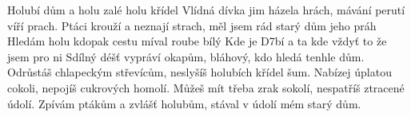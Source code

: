 \begin{TEXT}{Holubí dům}
\SLOKA {}  a  holu\NL
{}   \NL
{}  zalé\NL
{}   holu křídel 
\SLOKA Vlídná dívka jim házela hrách,\NL
   mávání perutí víří prach.\NL
   Ptáci krouží a neznají strach,\NL
   měl jsem rád starý dům jeho práh
\REFREN Hledám  holu kdopak  cestu  \NL
míval  roube bílý \NL
Kde je \Ch{}D7{bí} a ta  kde \NL
vždyť to  že jsem  pro ni 
\SLOKA Sdílný déšť vypráví okapům,\NL
   bláhový, kdo hledá tenhle dům.\NL
   Odrůstáš chlapeckým střevícům,\NL
   neslyšíš holubích křídel šum.
\SLOKA Nabízej úplatou cokoli,\NL
   nepojíš cukrových homolí.\NL
   Můžeš mít třeba zrak sokolí,\NL
   nespatříš ztracené údolí.
\REFREN Zpívám ptákům a zvlášť holubům,\NL
stával v údolí mém starý dům.
\end{TEXT}
